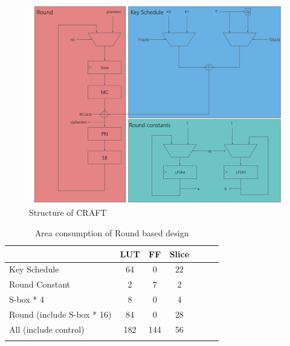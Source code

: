 \documentclass[sn-basic]{sn-jnl}%
\begin{document}
\begin{figure}[h]%
    \centering
    \includegraphics[width=\textwidth]{round_based_design.png}
    \caption{Structure of CRAFT}\label{fig2}
\end{figure}

\begin{table}[h]
    \caption{Area consumption of Round based design}\label{tab2}%
    \begin{tabular*}{\textwidth}{@{\extracolsep\fill}lcccccc}
        \toprule
        &LUT&	FF&	Slice                                \\
        \midrule
        Key Schedule &	64&	0&	22                           \\
        Round Constant&	2&	7&	2 \\
        S-box * 4&	8&	0&	4                             \\
        Round (include  S-box * 16)&	84&	0&	28                        \\
        All (include control)&	182&	144&	56                     \\
        \botrule
    \end{tabular*}
\end{table}
\end{document}
